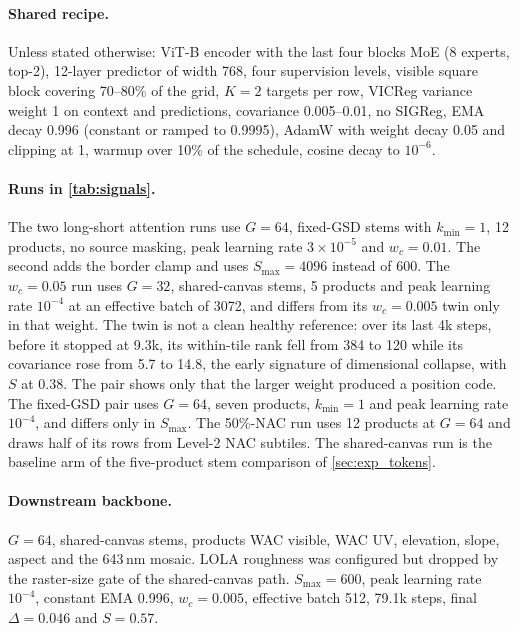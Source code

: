 \paragraph{Shared recipe.} Unless stated otherwise: ViT-B encoder with the last four blocks MoE (8 experts, top-2), 12-layer predictor of width 768, four supervision levels, visible square block covering 70--80\% of the grid, $K{=}2$ targets per row, VICReg variance weight 1 on context and predictions, covariance 0.005--0.01, no SIGReg, EMA decay 0.996 (constant or ramped to 0.9995), AdamW with weight decay 0.05 and clipping at 1, warmup over 10\% of the schedule, cosine decay to $10^{-6}$.

\paragraph{Runs in \cref{tab:signals}.} The two long-short attention runs use $G{=}64$, fixed-GSD stems with $k_{\min}{=}1$, 12 products, no source masking, peak learning rate $3{\times}10^{-5}$ and $w_c{=}0.01$. The second adds the border clamp and uses $S_{\max}{=}4096$ instead of 600. The $w_c{=}0.05$ run uses $G{=}32$, shared-canvas stems, 5 products and peak learning rate $10^{-4}$ at an effective batch of 3072, and differs from its $w_c{=}0.005$ twin only in that weight. The twin is not a clean healthy reference: over its last 4k steps, before it stopped at 9.3k, its within-tile rank fell from 384 to 120 while its covariance rose from 5.7 to 14.8, the early signature of dimensional collapse, with $S$ at 0.38. The pair shows only that the larger weight produced a position code. The fixed-GSD pair uses $G{=}64$, seven products, $k_{\min}{=}1$ and peak learning rate $10^{-4}$, and differs only in $S_{\max}$. The 50\%-NAC run uses 12 products at $G{=}64$ and draws half of its rows from Level-2 NAC subtiles. The shared-canvas run is the baseline arm of the five-product stem comparison of \cref{sec:exp_tokens}.

\paragraph{Downstream backbone.} $G{=}64$, shared-canvas stems, products WAC visible, WAC UV, elevation, slope, aspect and the 643\,nm mosaic. LOLA roughness was configured but dropped by the raster-size gate of the shared-canvas path. $S_{\max}{=}600$, peak learning rate $10^{-4}$, constant EMA 0.996, $w_c{=}0.005$, effective batch 512, 79.1k steps, final $\Delta{=}0.046$ and $S{=}0.57$.

